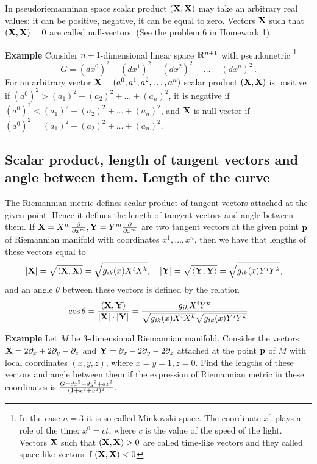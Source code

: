 \documentclass[12pt]{article}
\theoremstyle{theorem}
\numberwithin{equation}{section}
\begin{document}
In pseudoriemanninan space scalar product $({\bf X},{\bf X})$ may take an arbitrary real
values: it can be positive, negative, it can be equal to zero. Vectors
${\bf X}$ such that $({\bf X},{\bf X})=0$ are called null-vectors.
(See the problem 6 in Homework 1).

{\bf Example}  Consider $n+1$-dimensional
linear space ${\bf R}^{n+1}$ with pseudometric
\footnote{In the case $n=3$ it is so called Minkovski space.
The coordinate $x^0$ plays a
role of the time: $x^0=ct$, where $c$ is
the value of the speed of the light. Vectors ${\bf X}$ such that $({\bf X},{\bf X})>0$
are called time-like vectors and they called space-like vectors
if $({\bf X},{\bf X})<0$}
            $$
    G=(dx^0)^2-(dx^1)^2-(dx^2)^2-\dots-(dx^n)^2\,.
            $$
 For an arbitrary vector ${\bf X}=(a^0,a^1,a^2,\dots, a^n)$
scalar product $({\bf X},{\bf X})$ is positive if
$(a^0)^2>(a_1)^2+(a_2)^2+\dots+(a_n)^2$, it is negative if
$(a^0)^2<(a_1)^2+(a_2)^2+\dots+(a_n)^2$, and
${\bf X}$ is null-vector if  $(a^0)^2=(a_1)^2+(a_2)^2+\dots+(a_n)^2$.








\subsection {Scalar product, length of tangent vectors
and angle between them. Length of the curve}

The Riemannian metric defines scalar product of tangent vectors attached at the given point.
Hence it defines the length of tangent vectors and angle between them.
  If ${\bf X}=X^m{\partial \over \partial x^m}, {\bf Y}=Y^m{\partial \over \partial x^m}$ are two tangent vectors at the given point
  ${\bf p}$ of Riemannian manifold with coordinates $x^1,\dots,x^n$, then we have that lengths of
  these vectors equal to
   \begin{equation}\label{lengthandangle1}
    |{\bf X}|=\sqrt {\langle {\bf X},{\bf X}\rangle}=\sqrt {g_{ik}(x)X^iX^k},\quad
    |{\bf Y}|=\sqrt {\langle {\bf Y},{\bf Y}\rangle}=\sqrt {g_{ik}(x)Y^iY^k},\quad
\end{equation}
and an angle $\theta$ between these vectors is defined by the relation
         \begin{equation}\label{lengthandangle1}
    \cos\theta={{\langle {\bf X},{\bf Y}\rangle}\over |{\bf X}|\cdot|{\bf Y}|}={g_{ik}X^iY^k\over \sqrt {g_{ik}(x)X^iX^k}
    \sqrt {g_{ik}(x)Y^iY^k}}
\end{equation}

\m

{\bf Example} Let $M$ be $3$-dimensional Riemannian manifold.
 Consider the vectors ${\bf X}=2\partial_x+2\partial_y-\partial_z$ and ${\bf Y}=\partial_x-2\partial_y-2\partial_z$
attached at the point ${\bf p}$ of $M$ with
local coordinates $(x,y,z)$, where $x=y=1,z=0$.
Find the lengths of these vectors and angle between
them if the expression of Riemannian
metric in these coordinates is $G=dx^2+dy^2+dz^2\over (1+x^2+y^2)^2$.
\end{document}
